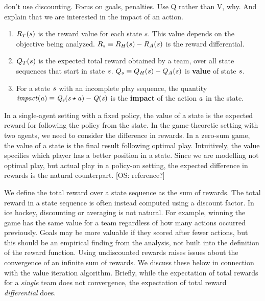 \documentclass[]{article}
\begin{document}
don't use discounting. Focus on goals, penalties. Use Q rather than V, why. And explain that we are interested in the impact of an action.

\begin{enumerate}
\item $R_{T}(s)$ is the reward value for each state $s$. This value depends on the objective being analyzed. $R_{s} \equiv R_{H}(s)- R_{A}(s)$ is the reward differential.
\item $Q_{T}(s)$ is the expected total reward obtained by a team, over all state sequences that start in state $s$. $Q_{s} \equiv Q_{H}(s)- Q_{A}(s)$ is \textbf{value} of state $s$.
\item For a state $s$ with an incomplete play sequence, the quantity $\it{impact}(a) \equiv Q_{s}(s \star a) - Q(s)$ is the \textbf{impact} of the action $a$ in the state.
\end{enumerate}

In a single-agent setting with a fixed policy, the value of a state is the expected reward for following the policy from the state. In the game-theoretic setting with two agents, we need to consider the difference in rewards. 
In a zero-sum game, the value of a state is the final result following optimal play. Intuitively, the value specifies which player has a better position in a state. Since we are modelling not optimal play, but actual play in a policy-on setting, the expected difference in rewards is the natural counterpart. [OS: reference?] 

We define the total reward over a state sequence as the sum of rewards. The total reward in a state sequence is often instead computed using a discount factor. In ice hockey, discounting or averaging is not natural. For example, winning the game has the same value for a team regardless of how many actions occurred previously. Goals may be more valuable if they scored after fewer actions, but this should be an empirical finding from the analysis, not built into the definition of the reward function. Using undiscounted rewards raises issues about the convergence of an infinite sum of rewards. We discuss these below in connection with the value iteration algorithm. Briefly, while the expectation of total rewards for a  {\em single} team does not convergence, the expectation of total reward {\em differential} does. 
\end{document}
